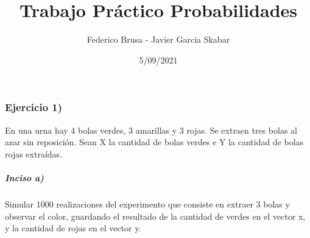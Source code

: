\documentclass[
]{article}
\title{Trabajo Práctico Probabilidades}
\author{Federico Brusa - Javier Garcia Skabar}
\date{5/09/2021}
\newenvironment{Shaded}{\begin{snugshade}}{\end{snugshade}}
\newcommand{\AttributeTok}[1]{\textcolor[rgb]{0.77,0.63,0.00}{#1}}
\newcommand{\ConstantTok}[1]{\textcolor[rgb]{0.00,0.00,0.00}{#1}}
\newcommand{\ControlFlowTok}[1]{\textcolor[rgb]{0.13,0.29,0.53}{\textbf{#1}}}
\newcommand{\DecValTok}[1]{\textcolor[rgb]{0.00,0.00,0.81}{#1}}
\newcommand{\FunctionTok}[1]{\textcolor[rgb]{0.00,0.00,0.00}{#1}}
\newcommand{\NormalTok}[1]{#1}
\newcommand{\OtherTok}[1]{\textcolor[rgb]{0.56,0.35,0.01}{#1}}
\newcommand{\SpecialCharTok}[1]{\textcolor[rgb]{0.00,0.00,0.00}{#1}}
\newcommand{\StringTok}[1]{\textcolor[rgb]{0.31,0.60,0.02}{#1}}
\begin{document}
\maketitle

\hypertarget{ejercicio-1}{%
\subsubsection{Ejercicio 1)}\label{ejercicio-1}}

En una urna hay 4 bolas verdes, 3 amarillas y 3 rojas. Se extraen tres
bolas al azar sin reposición. Sean X la cantidad de bolas verdes e Y la
cantidad de bolas rojas extraídas.

\hypertarget{inciso-a}{%
\subparagraph{Inciso a)}\label{inciso-a}}

Simular 1000 realizaciones del experimento que consiste en extraer 3
bolas y observar el color, guardando el resultado de la cantidad de
verdes en el vector x, y la cantidad de rojas en el vector y.

\begin{Shaded}
\end{Shaded}
\end{document}
